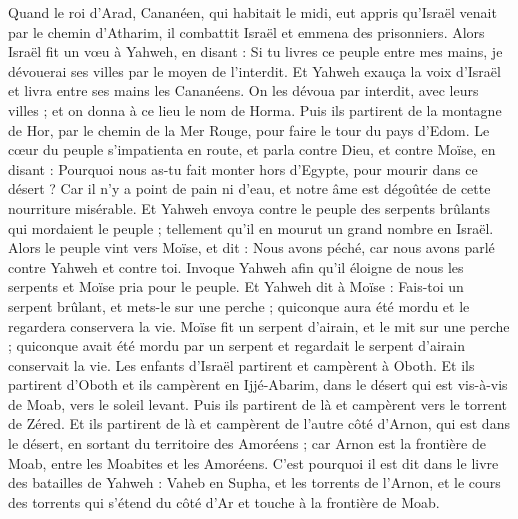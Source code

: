 \begin{multicols}{2}
\VerseOne{}Quand le roi d'Arad, Cananéen, qui habitait le midi, eut appris qu'Israël venait par le chemin d'Atharim, il combattit Israël et emmena des prisonniers.
Alors Israël fit un vœu à Yahweh, en disant : Si tu livres ce peuple entre mes mains, je dévouerai ses villes par le moyen de l'interdit.
Et Yahweh exauça la voix d'Israël et livra entre ses mains les Cananéens. On les dévoua par interdit, avec leurs villes ; et on donna à ce lieu le nom de Horma.
Puis ils partirent de la montagne de Hor, par le chemin de la Mer Rouge, pour faire le tour du pays d'Edom. Le cœur du peuple s'impatienta en route,
et parla contre Dieu, et contre Moïse, en disant : Pourquoi nous as-tu fait monter hors d'Egypte, pour mourir dans ce désert ? Car il n'y a point de pain ni d'eau, et notre âme est dégoûtée de cette nourriture misérable.
Et Yahweh envoya contre le peuple des serpents brûlants qui mordaient le peuple ; tellement qu'il en mourut un grand nombre en Israël.
Alors le peuple vint vers Moïse, et dit : Nous avons péché, car nous avons parlé contre Yahweh et contre toi. Invoque Yahweh afin qu'il éloigne de nous les serpents et Moïse pria pour le peuple.
Et Yahweh dit à Moïse : Fais-toi un serpent brûlant, et mets-le sur une perche ; quiconque aura été mordu et le regardera conservera la vie.
Moïse fit un serpent d'airain, et le mit sur une perche ; quiconque avait été mordu par un serpent et regardait le serpent d'airain conservait la vie.
Les enfants d'Israël partirent et campèrent à Oboth.
Et ils partirent d'Oboth et ils campèrent en Ijjé-Abarim, dans le désert qui est vis-à-vis de Moab, vers le soleil levant.
Puis ils partirent de là et campèrent vers le torrent de Zéred.
Et ils partirent de là et campèrent de l'autre côté d'Arnon, qui est dans le désert, en sortant du territoire des Amoréens ; car Arnon est la frontière de Moab, entre les Moabites et les Amoréens.
C'est pourquoi il est dit dans le livre des batailles de Yahweh : Vaheb en Supha, et les torrents de l'Arnon,
et le cours des torrents qui s'étend du côté d'Ar et touche à la frontière de Moab.

\end{multicols}
